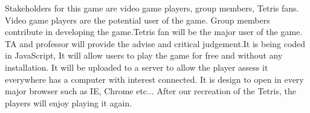 \documentclass[12pt,letterpaper]{article}
\newcommand\tab[1][1cm]{\hspace*{#1}}
\begin{document}
\tab Stakeholders for this game are video game players, group members, Tetris fans. {\color{red}Video game players are the potential user of the game. Group members contribute in developing the game.Tetris fan will be the major user of the game. TA and professor will provide the advise and critical judgement.}It is being coded in JavaScript, It will allow users to play the game for free and without any installation. {\color{red} It will be uploaded to a server to allow the player assess it everywhere has a computer with interest connected. It is design to open in every major browser such as IE, Chrome etc...}
After our recreation of the Tetris, the players will enjoy playing it again.
\end{document}
